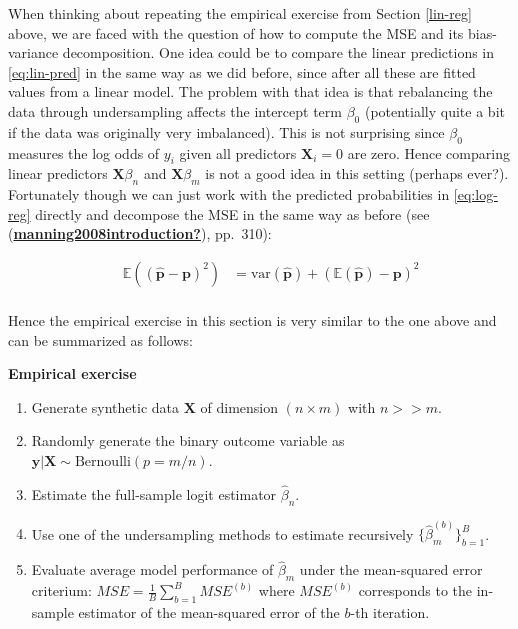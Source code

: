 \documentclass[
]{book}
\providecommand{\tightlist}{%
  \setlength{\itemsep}{0pt}\setlength{\parskip}{0pt}}
\begin{document}
When thinking about repeating the empirical exercise from Section \ref{lin-reg} above, we are faced with the question of how to compute the MSE and its bias-variance decomposition. One idea could be to compare the linear predictions in \eqref{eq:lin-pred} in the same way as we did before, since after all these are fitted values from a linear model. The problem with that idea is that rebalancing the data through undersampling affects the intercept term \(\beta_0\) (potentially quite a bit if the data was originally very imbalanced). This is not surprising since \(\beta_0\) measures the log odds of \(y_i\) given all predictors \(\mathbf{X}_i=0\) are zero. Hence comparing linear predictors \(\mathbf{X}\beta_n\) and \(\mathbf{X}\beta_m\) is not a good idea in this setting (perhaps ever?). Fortunately though we can just work with the predicted probabilities in \eqref{eq:log-reg} directly and decompose the MSE in the same way as before (see (\protect\hyperlink{ref-manning2008introduction}{\textbf{manning2008introduction?}}), pp.~310):

\[
\begin{equation} 
\begin{aligned}
&& \mathbb{E} \left( (\hat{\mathbf{p}}-\mathbf{p})^2 \right)
&= \text{var} (\hat{\mathbf{p}}) + \left( \mathbb{E} \left( \hat{\mathbf{p}} \right) - \mathbf{p} \right)^2 \\
\end{aligned}
\label{eq:mse-prob}
\end{equation}
\]

Hence the empirical exercise in this section is very similar to the one above and can be summarized as follows:

\textbf{Empirical exercise}

\begin{enumerate}
\def\labelenumi{\arabic{enumi}.}
\tightlist
\item
  Generate synthetic data \(\mathbf{X}\) of dimension \((n \times m)\) with \(n>>m\).
\item
  Randomly generate the binary outcome variable as \(\mathbf{y} | \mathbf{X} \sim \text{Bernoulli}(p=m/n)\).
\item
  Estimate the full-sample logit estimator \(\hat\beta_n\).
\item
  Use one of the undersampling methods to estimate recursively \(\{\hat\beta^{(b)}_m\}^B_{b=1}\).
\item
  Evaluate average model performance of \(\hat\beta_m\) under the mean-squared error criterium: \(MSE= \frac{1}{B} \sum_{b=1}^{B} MSE^{(b)}\) where \(MSE^{(b)}\) corresponds to the in-sample estimator of the mean-squared error of the \(b\)-th iteration.
\end{enumerate}
\end{document}
